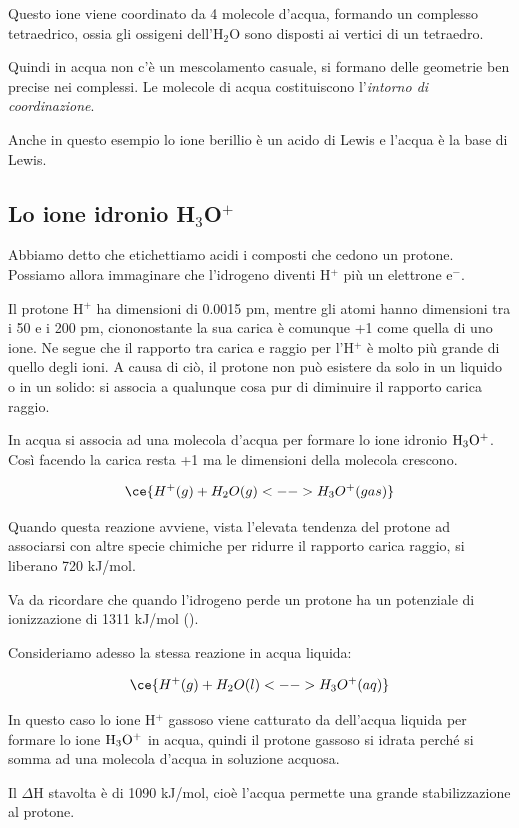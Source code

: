 Questo ione viene coordinato da 4 molecole d'acqua, formando un complesso tetraedrico, ossia gli ossigeni dell'H$_2$O sono disposti ai vertici di un tetraedro.

Quindi in acqua non c'è un mescolamento casuale, si formano delle geometrie ben precise nei complessi. Le molecole di acqua costituiscono l'\textit{intorno di coordinazione}.

Anche in questo esempio lo ione berillio è un acido di Lewis e l'acqua è la base di Lewis.

\subsection{Lo ione idronio H$_3$O$^+$}
Abbiamo detto che etichettiamo acidi i composti che cedono un protone. Possiamo allora immaginare che l'idrogeno diventi H$^+$ più un elettrone e$^-$.

Il protone H$^+$ ha dimensioni di 0.0015 pm, mentre gli atomi hanno dimensioni tra i 50 e i 200 pm, ciononostante la sua carica è comunque +1 come quella di uno ione. Ne segue che il rapporto tra carica e raggio per l'H$^+$ è molto più grande di quello degli ioni. A causa di ciò, il protone non può esistere da solo in un liquido o in un solido: si associa a qualunque cosa pur di diminuire il rapporto carica raggio.

In acqua si associa ad una molecola d'acqua per formare lo ione idronio $\rm H_3O^+$. Così facendo la carica resta +1 ma le dimensioni della molecola crescono.

$$\ce{H^+(g) + H_2O(g) <--> H_3O^+(gas)}$$

Quando questa reazione avviene, vista l'elevata tendenza del protone ad associarsi con altre specie chimiche per ridurre il rapporto carica raggio, si liberano 720 kJ/mol.

Va da ricordare che quando l'idrogeno perde un protone ha un potenziale di ionizzazione di 1311 kJ/mol ().

\vspace{0.2cm}Consideriamo adesso la stessa reazione in acqua liquida:

$$\ce{H^+(g) + H_2O(l) <--> H_3O^+(aq)}$$

In questo caso lo ione H$^+$ gassoso viene catturato da dell'acqua liquida per formare lo ione $\rm H_3O^+$ in acqua, quindi il protone gassoso si idrata perché si somma ad una molecola d'acqua in soluzione acquosa.

Il $\Delta$H stavolta è di 1090 kJ/mol, cioè l'acqua permette una grande stabilizzazione al protone.


